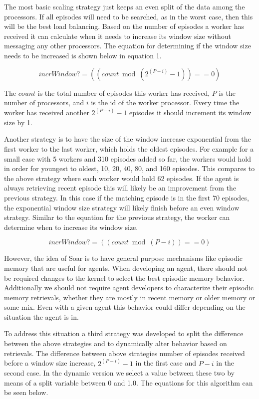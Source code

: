 \documentclass[11pt]{article} %
\begin{document}
The most basic scaling strategy just keeps an even split of the data among the
processors. If all episodes will need to be searched, as in the worst case, then
this will be the best load balancing. Based on the number of episodes a worker
has received it can calculate when it needs to increase its window size without
messaging any other processors. The equation for determining if the window size
needs to be increased is shown below in equation 1.

\begin{equation}
incrWindow? = ((count  \bmod  (2^{(P-i)} -1) ) == 0)
\end{equation}

The $count$ is the total number of episodes this worker has received, $P$ is the
number of processors, and $i$ is the id of the worker processor. Every time the
worker has received another $ 2^(P-i) -1 $ episodes it should increment its window
size by 1.

Another strategy is to have the size of the window increase exponential from the
first worker to the last worker, which holds the oldest episodes. For example
for a small case with 5 workers and 310 episodes added so far, the workers would
hold in order for youngest to oldest, 10, 20, 40, 80, and 160 episodes. This
compares to the above strategy where each worker would hold 62 episodes. If the
agent is always retrieving recent episode this will likely be an improvement
from the previous strategy. In this case if the matching episode is in the first
70 episodes, the exponential window size strategy will likely finish before an
even window strategy. Similar to the equation for the previous strategy, the
worker can determine when to increase its window size.

\begin{equation}incrWindow? = ((count  \bmod  (P-i) ) == 0)\label{eq.1}\end{equation}

However, the idea of Soar is to have general purpose mechanisms like episodic
memory that are useful for agents. When developing an agent, there should not be
required changes to the kernel to select the best episodic memory behavior.
Additionally we should not require agent developers to characterize their
episodic memory retrievals, whether they are mostly in recent memory or older
memory or some mix. Even with a given agent this behavior could differ depending
on the situation the agent is in.

To address this situation a third strategy was developed to split the difference
between the above strategies and to dynamically alter behavior based on
retrievals. The difference between above strategies number of episodes received
before a window size increase, $2^(P-i) -1$ in the first case and $P-i$ in the
second case. In the dynamic version we select a value between these two by means
of a split variable between 0 and 1.0. The equations for this algorithm can be
seen below.
\end{document}
